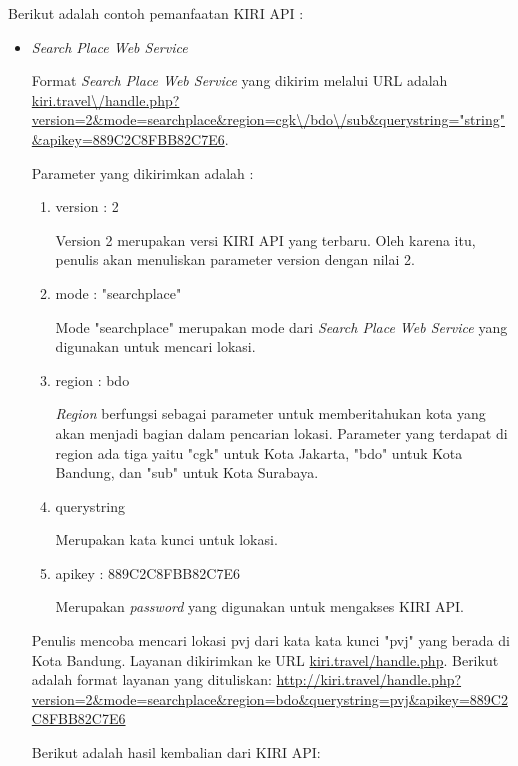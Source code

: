 Berikut adalah contoh pemanfaatan KIRI API :

\begin{itemize}
	\item \textit{Search Place Web Service}
	
	Format \textit{Search Place Web Service} yang dikirim melalui URL adalah \url{kiri.travel\/handle.php?version=2\&mode=searchplace\&region=cgk\/bdo\/sub\&querystring="string"\&apikey=889C2C8FBB82C7E6}.
	
	Parameter yang dikirimkan adalah :
	
	\begin{enumerate}
		\item version : 2
		
		Version 2 merupakan versi KIRI API yang terbaru. Oleh karena itu, penulis akan menuliskan parameter version dengan nilai 2.
		\item mode : "searchplace"
		
		Mode "searchplace" merupakan mode dari \textit{Search Place Web Service} yang digunakan untuk mencari lokasi.
		\item region : bdo
		
		\textit{Region} berfungsi sebagai parameter untuk memberitahukan kota yang akan menjadi bagian dalam pencarian lokasi. Parameter yang terdapat di region ada tiga yaitu "cgk" untuk Kota Jakarta, "bdo" untuk Kota Bandung, dan "sub" untuk Kota Surabaya.
		\item querystring
		
		Merupakan kata kunci untuk lokasi.
		\item apikey : 889C2C8FBB82C7E6
		
		Merupakan \textit{password} yang digunakan untuk mengakses KIRI API.
	\end{enumerate}
	
	Penulis mencoba mencari lokasi pvj dari kata kata kunci "pvj" yang berada di Kota Bandung. Layanan dikirimkan ke URL \url{kiri.travel/handle.php}. Berikut adalah format layanan yang dituliskan: \url{http://kiri.travel/handle.php?version=2&mode=searchplace&region=bdo&querystring=pvj&apikey=889C2C8FBB82C7E6}
	
	Berikut adalah hasil kembalian dari KIRI API:
	

\end{itemize}
